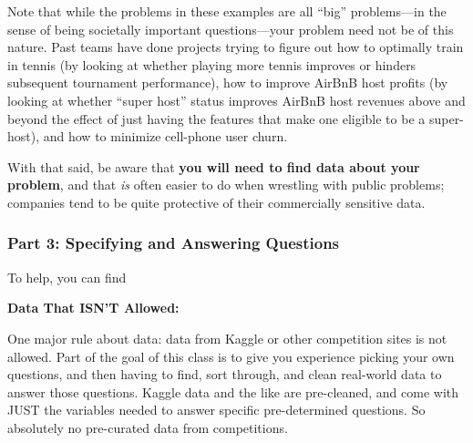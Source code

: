 \documentclass[12pt]{article}
\begin{document}
Note that while the problems in these examples are all ``big'' problems—in the sense of being societally important questions—your problem need not be of this nature. Past teams have done projects trying to figure out how to optimally train in tennis (by looking at whether playing more tennis improves or hinders subsequent tournament performance), how to improve AirBnB host profits (by looking at whether ``super host'' status improves AirBnB host revenues above and beyond the effect of just having the features that make one eligible to be a super-host), and how to minimize cell-phone user churn.

With that said, be aware that \textbf{you will need to find data about your problem}, and that \emph{is} often easier to do when wrestling with public problems; companies tend to be quite protective of their commercially sensitive data. 

\subsubsection*{Part 3: Specifying and Answering Questions}

To help, you can find 

\textbf{Data That ISN'T Allowed:}

One major rule about data: data from Kaggle or other competition sites is not allowed. Part of the goal of this class is to give you experience picking your own questions, and then having to find, sort through, and clean real-world data to answer those questions. Kaggle data and the like are pre-cleaned, and come with JUST the variables needed to answer specific pre-determined questions. So absolutely no pre-curated data from competitions. 
\end{document}
